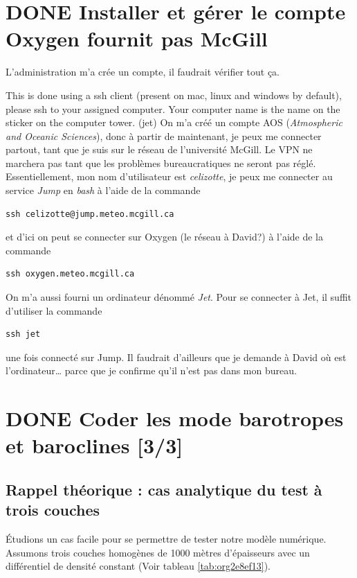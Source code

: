 \documentclass[10pt]{article}
\numberwithin{equation}{section}
\begin{document}
\section{{\bfseries\sffamily DONE} Installer et gérer le compte Oxygen fournit pas McGill}
\label{sec:orgf257aa0}
L'administration m'a crée un compte, il faudrait vérifier tout ça.

This is done using a ssh client (present on mac, linux and windows by default), please ssh to your assigned computer. Your computer name is the name on the sticker on the computer tower. (jet)
On m'a créé un compte AOS (\emph{Atmospheric and Oceanic Sciences}), donc à partir de maintenant, je peux me connecter partout, tant que je suis sur le réseau de l'université McGill.
Le VPN ne marchera pas tant que les problèmes bureaucratiques ne seront pas réglé.\\[0pt]

Essentiellement, mon nom d'utilisateur est \emph{celizotte}, je peux me connecter au service \emph{Jump} en \emph{bash} à l'aide de la commande
\begin{verbatim}
ssh celizotte@jump.meteo.mcgill.ca
\end{verbatim}
et d'ici on peut se connecter sur Oxygen (le réseau à David?) à l'aide de la commande
\begin{verbatim}
ssh oxygen.meteo.mcgill.ca
\end{verbatim}

On m'a aussi fourni un ordinateur dénommé \emph{Jet}. Pour se connecter à Jet, il suffit d'utiliser la commande
\begin{verbatim}
ssh jet
\end{verbatim}
une fois connecté sur Jump. Il faudrait d'ailleurs que je demande à David où est l'ordinateur\ldots{} parce que je confirme qu'il n'est pas dans mon bureau.

\section{{\bfseries\sffamily DONE} Coder les mode barotropes et baroclines [3/3]}
\label{sec:org362ad38}
\subsection{Rappel théorique : cas analytique du test à trois couches}
\label{sec:orgefabdb9}
Étudions un cas facile pour se permettre de tester notre modèle numérique.
Assumons trois couches homogènes de 1000 mètres d'épaisseurs avec un différentiel de densité constant (Voir tableau \ref{tab:org2e8ef13}).
\end{document}
